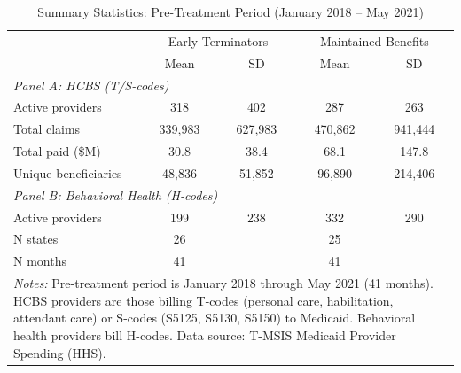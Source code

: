 \begin{table}[htbp]
\centering
\caption{Summary Statistics: Pre-Treatment Period (January 2018 -- May 2021)}
\label{tab:summary_stats}
\begin{tabular}{lcccc}
\hline\hline
 & \multicolumn{2}{c}{Early Terminators} & \multicolumn{2}{c}{Maintained Benefits} \\
 & Mean & SD & Mean & SD \\
\hline
\multicolumn{5}{l}{\textit{Panel A: HCBS (T/S-codes)}} \\
Active providers & 318 & 402 & 287 & 263 \\
Total claims & 339,983 & 627,983 & 470,862 & 941,444 \\
Total paid (\$M) & 30.8 & 38.4 & 68.1 & 147.8 \\
Unique beneficiaries & 48,836 & 51,852 & 96,890 & 214,406 \\
\hline
\multicolumn{5}{l}{\textit{Panel B: Behavioral Health (H-codes)}} \\
Active providers & 199 & 238 & 332 & 290 \\
\hline
N states & 26 & & 25 & \\
N months & 41 & & 41 & \\
\hline\hline
\multicolumn{5}{p{12cm}}{\footnotesize \textit{Notes:} Pre-treatment period is January 2018 through May 2021 (41 months). HCBS providers are those billing T-codes (personal care, habilitation, attendant care) or S-codes (S5125, S5130, S5150) to Medicaid. Behavioral health providers bill H-codes. Data source: T-MSIS Medicaid Provider Spending (HHS).} \\
\end{tabular}
\end{table}

